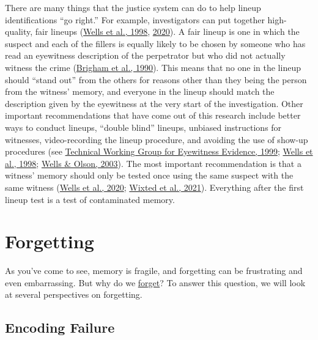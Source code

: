 \documentclass[
]{krantz}
\begin{document}
There are many things that the justice system can do to help lineup identifications ``go right.'' For example, investigators can put together high-quality, fair lineups (\protect\hyperlink{ref-wells1998eyewitness}{Wells et al., 1998}, \protect\hyperlink{ref-wells2020policy}{2020}). A fair lineup is one in which the suspect and each of the fillers is equally likely to be chosen by someone who has read an eyewitness description of the perpetrator but who did not actually witness the crime (\protect\hyperlink{ref-brigham1990standards}{Brigham et al., 1990}). This means that no one in the lineup should ``stand out'' from the others for reasons other than they being the person from the witness' memory, and everyone in the lineup should match the description given by the eyewitness at the very start of the investigation. Other important recommendations that have come out of this research include better ways to conduct lineups, ``double blind'' lineups, unbiased instructions for witnesses, video-recording the lineup procedure, and avoiding the use of show-up procedures (see \protect\hyperlink{ref-twg1999eyewitness}{Technical Working Group for Eyewitness Evidence, 1999}; \protect\hyperlink{ref-wells1998eyewitness}{Wells et al., 1998}; \protect\hyperlink{ref-wells2003eyewitness}{Wells \& Olson, 2003}). The most important recommendation is that a witness' memory should only be tested once using the same suspect with the same witness (\protect\hyperlink{ref-wells2020policy}{Wells et al., 2020}; \protect\hyperlink{ref-wixted2021test}{Wixted et al., 2021}). Everything after the first lineup test is a test of contaminated memory.

\hypertarget{forgetting}{%
\section{Forgetting}\label{forgetting}}

As you've come to see, memory is fragile, and forgetting can be frustrating and even embarrassing. But why do we \protect\hyperlink{forgetting}{forget}? To answer this question, we will look at several perspectives on forgetting.

\hypertarget{encoding-failure}{%
\subsection*{Encoding Failure}\label{encoding-failure}}
\end{document}
